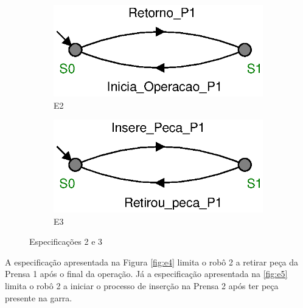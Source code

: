 \begin{figure}[H]%
  \centering
  \begin{subfigure}[b]{0.45\textwidth}
      \centering
      \includegraphics[width=\textwidth]{imagens/E2.eps}
      \caption{E2}
      \label{fig:e2}
  \end{subfigure}
  \hfill
  \begin{subfigure}[b]{0.45\textwidth}
      \centering
      \includegraphics[width=\textwidth]{imagens/E3.eps}
      \caption{E3}
      \label{fig:e3}
  \end{subfigure}
  \caption{Especificações 2 e 3}
  \label{fig:e23}
\end{figure}

A especificação apresentada na Figura \ref{fig:e4} limita o robô 2 a retirar peça da Prensa 1 após o final da operação.
Já a especificação apresentada na \ref{fig:e5} limita o robô 2 a iniciar o processo de inserção na Prensa 2 após ter peça presente na garra.

